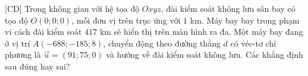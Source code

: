 \begin{ex}%
[CD]%
	Trong không gian với hệ tọa độ $Oxyz$, đài kiểm soát không lưu sân bay có tọa độ $O(0;0;0)$, mỗi đơn vị trên trục ứng với $1$ km. Máy bay bay trong phạm vi cách đài kiểm soát $417$ km sẽ hiển thị trên màn hình ra đa. Một máy bay đang ở vị trí $A\left(-688;-185;8\right)$, chuyển động theo đường thẳng $d$ có véc-tơ chỉ phương là $\overrightarrow{u}=(91;75;0)$ và hướng về đài kiểm soát không lưu. Các khẳng định sau đúng hay sai?
	\begin{center}
\end{center}
\end{ex}

